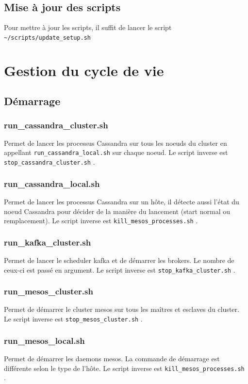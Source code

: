 \documentclass[a4paper, 11pt, titlepage]{article}
\begin{document}
\subsection {Mise à jour des scripts}

Pour mettre à jour les scripts, il suffit de lancer le script \lstinline!~/scripts/update_setup.sh!



\section {Gestion du cycle de vie}

\subsection {Démarrage}

\subsubsection*{run\_cassandra\_cluster.sh}
Permet de lancer les processus Cassandra sur tous les noeuds du cluster en appellant \lstinline!run_cassandra_local.sh! sur chaque noeud.
Le script inverse est \lstinline!stop_cassandra_cluster.sh! .

\subsubsection*{run\_cassandra\_local.sh}
Permet de lancer les processus Cassandra sur un hôte, il détecte aussi l'état du noeud Cassandra pour décider de la manière du lancement (start normal ou remplacement).
Le script inverse est \lstinline!kill_mesos_processes.sh! .

\subsubsection*{run\_kafka\_cluster.sh}
Permet de lancer le scheduler kafka et de démarrer les brokers. Le nombre de ceux-ci est passé en argument.
Le script inverse est \lstinline!stop_kafka_cluster.sh! .

\subsubsection*{run\_mesos\_cluster.sh}
Permet de démarrer le cluster mesos sur tous les maîtres et esclaves du cluster.
Le script inverse est \lstinline!stop_mesos_cluster.sh! .

\subsubsection*{run\_mesos\_local.sh}
Permet de démarrer les daemons mesos. La commande de démarrage est différente selon le type de l'hôte.
Le script inverse est \lstinline!kill_mesos_processes.sh! .
\end{document}

